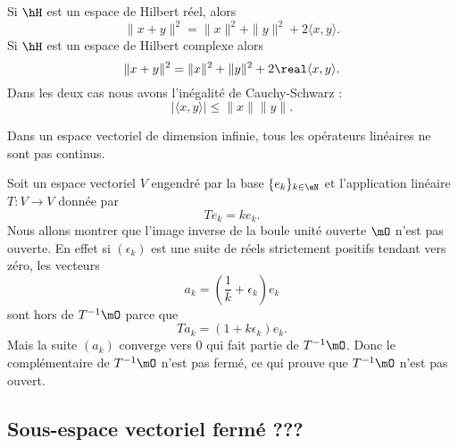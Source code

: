 \begin{proposition}     \label{PropTdupIG}
    Si \( \hH\) est un espace de Hilbert réel, alors
    \begin{equation}
        \| x+y \|^2=\| x \|^2+\| y \|^2+2\langle x, y\rangle .
    \end{equation}
    Si \( \hH\) est un espace de Hilbert complexe alors
    \begin{equation}        \label{EqrbBlkK}
        \| x+y \|^2=\| x \|^2+\| y \|^2+2\real\langle x, y\rangle .
    \end{equation}
    Dans les deux cas nous avons l'inégalité de Cauchy-Schwarz :
    \begin{equation}
        | \langle x, y\rangle  |\leq \| x \|\| y \|.
    \end{equation}
\end{proposition}

Dans un espace vectoriel de dimension infinie, tous les opérateurs linéaires ne sont pas continus.

\begin{example}
    Soit un espace vectoriel \( V\) engendré par la base \( \{ e_k \}_{k\in \eN}\) et l'application linéaire \( T\colon V\to V\) donnée par
    \begin{equation}
        Te_k=ke_k.
    \end{equation}
    Nous allons montrer que l'image inverse de la boule unité ouverte \( \mO\) n'est pas ouverte. En effet si \( (\epsilon_k)\) est une suite de réels strictement positifs tendant vers zéro, les vecteurs
    \begin{equation}
        a_k=\left( \frac{1}{ k }+\epsilon_k \right)e_k
    \end{equation}
    sont hors de \( T^{-1}\mO\) parce que
    \begin{equation}
        Ta_k=(1+k\epsilon_k)e_k.
    \end{equation}
    Mais la suite \( (a_k)\) converge vers \( 0\) qui fait partie de \( T^{-1}\mO\). Donc le complémentaire de \( T^{-1}\mO\) n'est pas fermé, ce qui prouve que \( T^{-1}\mO\) n'est pas ouvert.
\end{example}

\subsection{Sous-espace vectoriel fermé ???}

